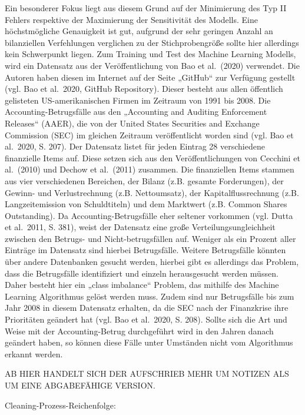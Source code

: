 \documentclass[a4paper, nobind]{templates/ociamthesis}
\begin{document}
Ein besonderer Fokus liegt aus diesem Grund auf der Minimierung des Typ II Fehlers respektive der Maximierung der Sensitivität des Modells. Eine höchstmögliche Genauigkeit ist gut, aufgrund der sehr geringen Anzahl an bilanziellen Verfehlungen verglichen zu der Stichprobengröße sollte hier allerdings kein Schwerpunkt liegen.
Zum Training und Test des Machine Learning Modells, wird ein Datensatz aus der Veröffentlichung von Bao et al.~(2020) verwendet. Die Autoren haben diesen im Internet auf der Seite „GitHub`` zur Verfügung gestellt (vgl. Bao et al.~2020, GitHub Repository). Dieser besteht aus allen öffentlich gelisteten US-amerikanischen Firmen im Zeitraum von 1991 bis 2008. Die Accounting-Betrugsfälle aus den „Accounting and Auditing Enforcement Releases`` (AAER), die von der United States Securities and Exchange Commission (SEC) im gleichen Zeitraum veröffentlicht worden sind (vgl. Bao et al.~2020, S. 207). Der Datensatz listet für jeden Eintrag 28 verschiedene finanzielle Items auf. Diese setzen sich aus den Veröffentlichungen von Cecchini et al.~(2010) und Dechow et al.~(2011) zusammen. Die finanziellen Items stammen aus vier verschiedenen Bereichen, der Bilanz (z.B. gesamte Forderungen), der Gewinn- und Verlustrechnung (z.B. Nettoumsatz), der Kapitalflussrechnung (z.B. Langzeitemission von Schuldtiteln) und dem Marktwert (z.B. Common Shares Outstanding).
Da Accounting-Betrugsfälle eher seltener vorkommen (vgl. Dutta et al.~2011, S. 381), weist der Datensatz eine große Verteilungsungleichheit zwischen den Betrugs- und Nicht-betrugsfällen auf. Weniger als ein Prozent aller Einträge im Datensatz sind hierbei Betrugsfälle. Weitere Betrugsfälle könnten über andere Datenbanken gesucht werden, hierbei gibt es allerdings das Problem, dass die Betrugsfälle identifiziert und einzeln herausgesucht werden müssen. Daher besteht hier ein „class imbalance`` Problem, das mithilfe des Machine Learning Algorithmus gelöst werden muss.
Zudem sind nur Betrugsfälle bis zum Jahr 2008 in diesem Datensatz erhalten, da die SEC nach der Finanzkrise ihre Prioritäten geändert hat (vgl. Bao et al.~2020, S. 208). Sollte sich die Art und Weise mit der Accounting-Betrug durchgeführt wird in den Jahren danach geändert haben, so können diese Fälle unter Umständen nicht vom Algorithmus erkannt werden.

AB HIER HANDELT SICH DER AUFSCHRIEB MEHR UM NOTIZEN ALS UM EINE ABGABEFÄHIGE VERSION.

Cleaning-Prozess-Reichenfolge:
\end{document}
